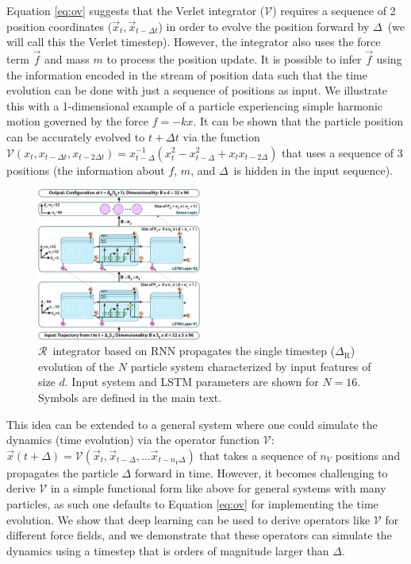 \documentclass[aps,prl,twocolumn,superscriptaddress,tightenlines,longbibliography, reprint]{revtex4-1}
\newcommand{\dt}{$\Delta$}
\newcommand{\dtR}{$\Delta_{\textrm{R}}$}
\newcommand{\R}{$\mathscr{R}$}
\newcommand{\V}{$\mathscr{V}$}
\begin{document}
Equation \ref{eq:ov} suggests that the Verlet integrator (\V) requires a sequence of 2 position coordinates ($\vec{x}_t, \vec{x}_{t-\Delta t}$) in order to evolve the position forward by \dt\ (we will call this the Verlet timestep). However, the integrator also uses the force term $\vec{f}$ and mass $m$ to process the position update. It is possible to infer $\vec{f}$ using the information encoded in the stream of position data such that the time evolution can be done with just a sequence of positions as input.
We illustrate this with a 1-dimensional example of a particle experiencing simple harmonic motion governed by the force $f = -k x$. It can be shown that the particle position can be accurately evolved to $t+\Delta t$ via the function $\mathcal{V}\left(x_t, x_{t-\Delta t}, x_{t - 2\Delta t}\right) = x_{t-\Delta}^{-1}\left( x_{t}^2 - x_{t-\Delta}^2 + x_{t}x_{t-2\Delta} \right)$ that uses a sequence of 3 positions (the information about $f$, $m$, and \dt\ is hidden in the input sequence). 
\begin{figure}[thb]
\centering
\includegraphics[width=0.48\textwidth]{figures/fig1.jpg}
\caption{\R\ integrator based on RNN propagates the single timestep (\dtR) evolution of the $N$ particle system characterized by input features of size $d$. Input system and LSTM parameters are shown for $N=16$. Symbols are defined in the main text.}
\label{fig:LSTMArchitecture}
\end{figure}
This idea can be extended to a general system where one could simulate the dynamics (time evolution) via the operator function $\mathcal{V}$: $\vec{x}(t+\Delta) = \mathcal{V}\left(\vec{x}_t,  \vec{x}_{t-\Delta}, \ldots \vec{x}_{t-n_V\Delta}\right)$ that takes a sequence of $n_V$ positions and propagates the particle $\Delta$ forward in time. 
However, it becomes challenging to derive $\mathcal{V}$ in a simple functional form like above for general systems with many particles, as such one defaults to Equation \ref{eq:ov} for implementing the time evolution. 
We show that deep learning can be used to derive operators like $\mathcal{V}$ for different force fields, and we demonstrate that these operators can simulate the dynamics using a timestep that is orders of magnitude larger than \dt.
\end{document}
